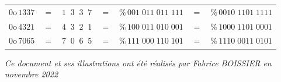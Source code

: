 \documentclass[11pt,a4paper]{article}
\begin{document}
\begin{tabular}{l c c c c c c}
$ 0\text{o} \, 1337 $  &  $ = $  & $ 1 \; \; 3 \; \;  3 \; \;  7 $ & $ = $ & $ \% \, 001 \; 011 \; 011 \; 111 $ &
                                                                     $ = $ & $ \% \, 0010 \; 1101 \; 1111 $  \\
$ 0\text{o} \, 4321 $  &  $ = $  & $ 4 \; \; 3 \; \;  2 \; \;  1 $ & $ = $ & $ \% \, 100 \; 011 \; 010 \; 001 $ &
                                                                     $ = $ & $ \% \, 1000 \; 1101 \; 0001 $  \\
$ 0\text{o} \, 7065 $  &  $ = $  & $ 7 \; \; 0 \; \;  6 \; \;  5 $ & $ = $ & $ \% \, 111 \; 000 \; 110 \; 101 $ &
                                                                     $ = $ & $ \% \, 1110 \; 0011 \; 0101 $  \\
\end{tabular}

\bigskip



\vfillFirst

\vfillLast

\begin{center}
\textit{Ce document et ses illustrations ont été réalisés par Fabrice BOISSIER en novembre 2022}
\end{center}
\end{document}
